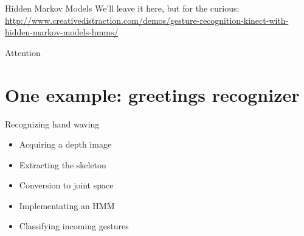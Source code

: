 \documentclass[compress]{beamer}
\begin{document}
\begin{frame}{Hidden Markov Models}
    We'll leave it here, but for the curious:\\
    \url{http://www.creativedistraction.com/demos/gesture-recognition-kinect-with-hidden-markov-models-hmms/}
\end{frame}

\begin{frame}{Attention}
\end{frame}



\section{One example: greetings recognizer}

\begin{frame}{Recognizing hand waving}
    \begin{itemize}
        \item Acquiring a depth image
        \item Extracting the skeleton
        \item Conversion to joint space
        \item Implementating an HMM
        \item Classifying incoming gestures
    \end{itemize}
\end{frame}
\end{document}
